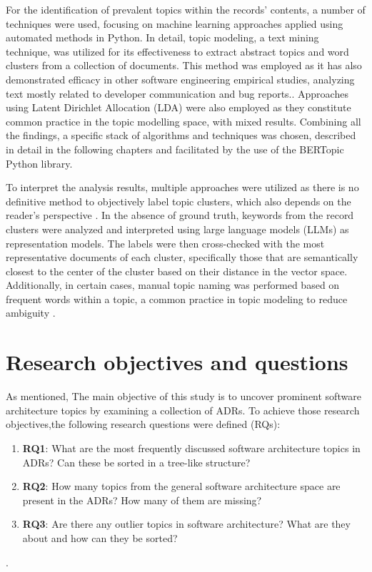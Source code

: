         For the identification of prevalent topics within the records' contents, a number of techniques were used, focusing on machine learning approaches applied using automated methods in Python. In detail, topic modeling, a text mining technique, was utilized for its effectiveness to extract abstract topics and word clusters from a collection of documents. This method was employed as it has also demonstrated efficacy in other software engineering empirical studies, analyzing text mostly related to developer communication and bug reports.\cite{Topic_modeling_in_software_engineering_research}. Approaches using Latent Dirichlet Allocation (LDA) were also employed as they constitute common practice in the topic modelling space, with mixed results. Combining all the findings, a specific stack of algorithms and techniques was chosen, described in detail in the following chapters and facilitated by the use of the BERTopic Python library. \cite{bertTopic}

        To interpret the analysis results, multiple approaches were utilized as there is no definitive method to objectively label topic clusters, which also depends on the reader's perspective \cite{datasciencecentralTopicModeling}. In the absence of ground truth, keywords from the record clusters were analyzed and interpreted using large language models (LLMs) as representation models. The labels were then cross-checked with the most representative documents of each cluster, specifically those that are semantically closest to the center of the cluster based on their distance in the vector space. Additionally, in certain cases, manual topic naming was performed based on frequent words within a topic, a common practice in topic modeling to reduce ambiguity \cite{Topic_modeling_in_software_engineering_research}.
        
    \section{Research objectives and questions}
        As mentioned, The main objective of this study is to uncover prominent software architecture topics by examining a collection of ADRs. To achieve those research objectives,the following research questions were defined (RQs):

        \begin{enumerate}
            \item \textbf{RQ1}: What are the most frequently discussed software architecture topics in ADRs? Can these be sorted in a tree-like structure? 
            \item \textbf{RQ2}: How many topics from the general software architecture space are present in the ADRs? How many of them are missing?
            \item \textbf{RQ3}: Are there any outlier topics in software architecture? What are they about and how can they be sorted?  
        \end{enumerate}. 

